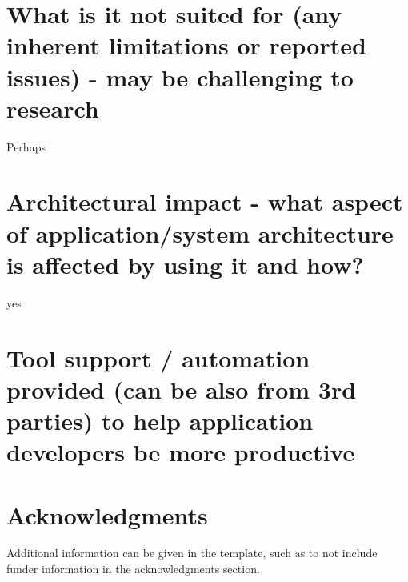\documentclass[fleqn,12pt]{olplainarticle}
\begin{document}
\section*{What is it not suited for (any inherent limitations or reported issues) - may be challenging to research}

Perhaps

\section*{Architectural impact - what aspect of application/system architecture is affected by using it and how?}
yes
\section*{Tool support / automation provided (can be also from 3rd parties) to help application developers be more productive}

\section*{Acknowledgments}

Additional information can be given in the template, such as to not include funder information in the acknowledgments section.


\end{document}
